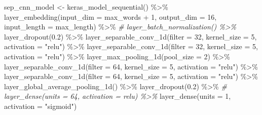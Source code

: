\documentclass[
]{article}
\newenvironment{Shaded}{}{}
\newcommand{\AttributeTok}[1]{\textcolor[rgb]{0.49,0.56,0.16}{#1}}
\newcommand{\CommentTok}[1]{\textcolor[rgb]{0.38,0.63,0.69}{\textit{#1}}}
\newcommand{\DecValTok}[1]{\textcolor[rgb]{0.25,0.63,0.44}{#1}}
\newcommand{\FloatTok}[1]{\textcolor[rgb]{0.25,0.63,0.44}{#1}}
\newcommand{\FunctionTok}[1]{\textcolor[rgb]{0.02,0.16,0.49}{#1}}
\newcommand{\NormalTok}[1]{#1}
\newcommand{\OtherTok}[1]{\textcolor[rgb]{0.00,0.44,0.13}{#1}}
\newcommand{\SpecialCharTok}[1]{\textcolor[rgb]{0.25,0.44,0.63}{#1}}
\newcommand{\StringTok}[1]{\textcolor[rgb]{0.25,0.44,0.63}{#1}}
\begin{document}
\begin{Shaded}
\begin{Highlighting}[]
\NormalTok{sep\_cnn\_model }\OtherTok{\textless{}{-}} \FunctionTok{keras\_model\_sequential}\NormalTok{() }\SpecialCharTok{\%\textgreater{}\%}
    \FunctionTok{layer\_embedding}\NormalTok{(}\AttributeTok{input\_dim =}\NormalTok{ max\_words }\SpecialCharTok{+} \DecValTok{1}\NormalTok{, }\AttributeTok{output\_dim =} \DecValTok{16}\NormalTok{, }\AttributeTok{input\_length =}\NormalTok{ max\_length) }\SpecialCharTok{\%\textgreater{}\%}
    \CommentTok{\# layer\_batch\_normalization() \%\textgreater{}\%}
\FunctionTok{layer\_dropout}\NormalTok{(}\FloatTok{0.2}\NormalTok{) }\SpecialCharTok{\%\textgreater{}\%}
    \FunctionTok{layer\_separable\_conv\_1d}\NormalTok{(}\AttributeTok{filter =} \DecValTok{32}\NormalTok{, }\AttributeTok{kernel\_size =} \DecValTok{5}\NormalTok{, }\AttributeTok{activation =} \StringTok{"relu"}\NormalTok{) }\SpecialCharTok{\%\textgreater{}\%}
    \FunctionTok{layer\_separable\_conv\_1d}\NormalTok{(}\AttributeTok{filter =} \DecValTok{32}\NormalTok{, }\AttributeTok{kernel\_size =} \DecValTok{5}\NormalTok{, }\AttributeTok{activation =} \StringTok{"relu"}\NormalTok{) }\SpecialCharTok{\%\textgreater{}\%}
    \FunctionTok{layer\_max\_pooling\_1d}\NormalTok{(}\AttributeTok{pool\_size =} \DecValTok{2}\NormalTok{) }\SpecialCharTok{\%\textgreater{}\%}
    \FunctionTok{layer\_separable\_conv\_1d}\NormalTok{(}\AttributeTok{filter =} \DecValTok{64}\NormalTok{, }\AttributeTok{kernel\_size =} \DecValTok{5}\NormalTok{, }\AttributeTok{activation =} \StringTok{"relu"}\NormalTok{) }\SpecialCharTok{\%\textgreater{}\%}
    \FunctionTok{layer\_separable\_conv\_1d}\NormalTok{(}\AttributeTok{filter =} \DecValTok{64}\NormalTok{, }\AttributeTok{kernel\_size =} \DecValTok{5}\NormalTok{, }\AttributeTok{activation =} \StringTok{"relu"}\NormalTok{) }\SpecialCharTok{\%\textgreater{}\%}
    \FunctionTok{layer\_global\_average\_pooling\_1d}\NormalTok{() }\SpecialCharTok{\%\textgreater{}\%}
    \FunctionTok{layer\_dropout}\NormalTok{(}\FloatTok{0.2}\NormalTok{) }\SpecialCharTok{\%\textgreater{}\%}
    \CommentTok{\# layer\_dense(units = 64, activation = \textquotesingle{}relu\textquotesingle{}) \%\textgreater{}\%}
\FunctionTok{layer\_dense}\NormalTok{(}\AttributeTok{units =} \DecValTok{1}\NormalTok{, }\AttributeTok{activation =} \StringTok{"sigmoid"}\NormalTok{)}


\end{Highlighting}
\end{Shaded}
\end{document}
